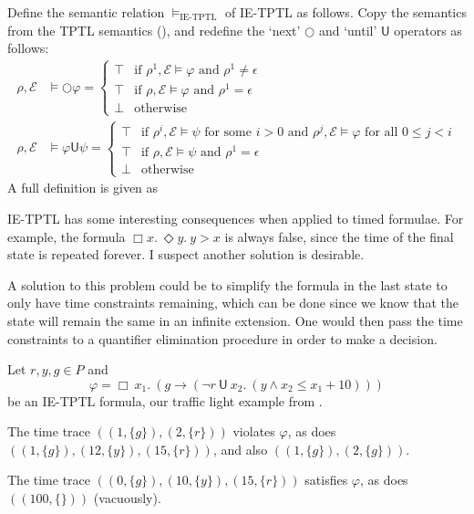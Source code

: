 \documentclass[a4paper]{article}
\newcommand{\U}{\mathsf{U}}
\newcommand{\tand}{\text{ and }}
\newcommand{\fsome}{\text{ for some }}
\newcommand{\fall}{\text{ for all }}
\newcommand{\eval}{\mathcal{E}}
\begin{document}
\begin{defn}\label{ietptlsem}

  Define the semantic relation $\vDash_{\text{IE-TPTL}}$ of IE-TPTL as follows. Copy the semantics from the TPTL semantics (), and redefine the `next' $\bigcirc$ and `until' $\U$ operators as follows:
  \begin{align*}
    \rho,\eval&\vDash \bigcirc \varphi =
    \begin{cases}
      \top &\text{if } \rho^1,\eval \vDash \varphi \tand \rho^1 \ne \epsilon\\
      \top &\text{if } \rho,\eval\vDash \varphi \tand \rho^1 = \epsilon\\
      \bot &\text{otherwise}
    \end{cases}\\
    \rho,\eval&\vDash \varphi \U \psi =
    \begin{cases}
      \top &\text{if } \rho^i,\eval \vDash \psi \fsome i > 0 \tand \rho^j,\eval \vDash \varphi \fall 0 \leq j < i\\
      \top &\text{if } \rho,\eval\vDash \psi \tand \rho^1 = \epsilon\\
      \bot &\text{otherwise}
    \end{cases}
  \end{align*}
  A full definition is given as 
\end{defn}

\begin{remk}
IE-TPTL has some interesting consequences when applied to timed formulae. For example, the formula $\Box x.~ \Diamond y.~ y > x$ is always false, since the time of the final state is repeated forever. I suspect another solution is desirable.

A solution to this problem could be to simplify the formula in the last state to only have time constraints remaining, which can be done since we know that the state will remain the same in an infinite extension. One would then pass the time constraints to a quantifier elimination procedure in order to make a decision.
\end{remk}

\begin{eg}\label{ietptleg}
  Let $r,y,g\in P$ and \[\varphi = \Box ~x_1.~ (g \to (\neg r ~\U~ x_2.~ (y \land x_2 \leq x_1 + 10) ))\] be an IE-TPTL formula, our traffic light example from .

  The time trace $((1,\{g\}),(2,\{r\}))$ violates $\varphi$, as does $((1,\{g\}),(12,\{y\}),(15,\{r\}))$, and also $((1,\{g\}),(2,\{g\}))$.

  The time trace $((0,\{g\}),(10,\{y\}),(15,\{r\}))$ satisfies $\varphi$, as does $((100,\{\}))$ (vacuously).
\end{eg}
\end{document}
